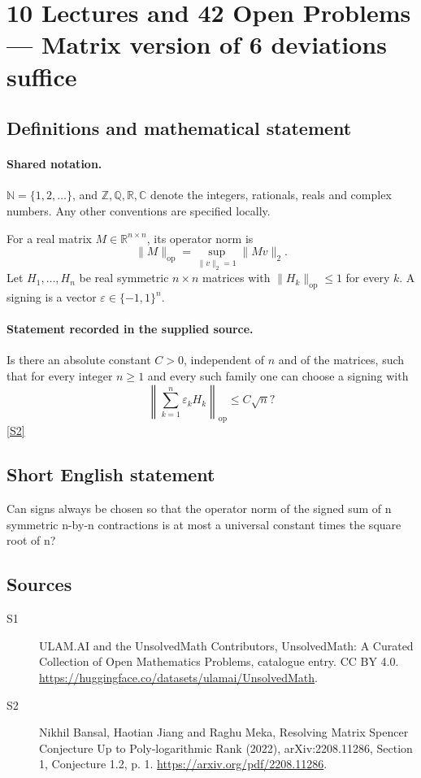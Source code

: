 \documentclass[11pt]{article}
\newcommand{\sref}[2]{\hyperlink{source:#1:#2}{[S#2]}}
\begin{document}
\section{10 Lectures and 42 Open Problems — Matrix version of 6 deviations suffice}\label{statement}

\subsection{Definitions and mathematical statement}

\paragraph{Shared notation.}$\mathbb N=\{1,2,\ldots\}$, and $\mathbb Z,\mathbb Q,\mathbb R,\mathbb C$ denote the integers, rationals, reals and complex numbers. Any other conventions are specified locally.


For a real matrix \(M\in\mathbb R^{n\times n}\), its operator norm is
\[\|M\|_{\mathrm{op}}=\sup_{\|v\|_2=1}\|Mv\|_2.\]
Let \(H_1,\ldots,H_n\) be real symmetric \(n\times n\) matrices with \(\|H_k\|_{\mathrm{op}}\le1\) for every \(k\). A signing is a vector \(\varepsilon\in\{-1,1\}^n\).
\paragraph{Statement recorded in the supplied source.}
Is there an absolute constant \(C>0\), independent of \(n\) and of the matrices, such that for every integer \(n\ge1\) and every such family one can choose a signing with
\[\left\|\sum_{k=1}^n\varepsilon_k H_k\right\|_{\mathrm{op}}\le C\sqrt n?\] \sref{statement}{2}
\subsection{Short English statement}
Can signs always be chosen so that the operator norm of the signed sum of n symmetric n-by-n contractions is at most a universal constant times the square root of n?
\subsection{Sources}
\begin{description}
\item[\hypertarget{source:statement:1}{S1}] ULAM.AI and the UnsolvedMath Contributors, UnsolvedMath: A Curated Collection of Open Mathematics Problems, catalogue entry. CC BY 4.0. \url{https://huggingface.co/datasets/ulamai/UnsolvedMath}.
\item[\hypertarget{source:statement:2}{S2}] Nikhil Bansal, Haotian Jiang and Raghu Meka, Resolving Matrix Spencer Conjecture Up to Poly-logarithmic Rank (2022), arXiv:2208.11286, Section 1, Conjecture 1.2, p. 1. \url{https://arxiv.org/pdf/2208.11286}.
\end{description}
\label{end:statement}
\end{document}
